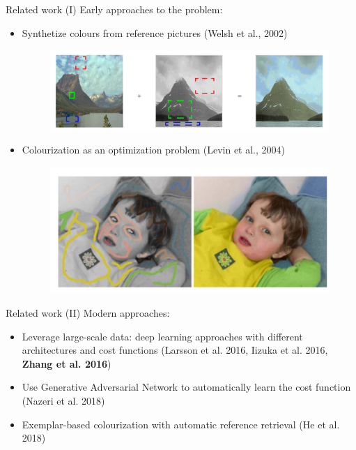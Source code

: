 \documentclass{beamer}
\begin{document}
\begin{frame}{Related work (I)}
  Early approaches to the problem:

    \medskip

    \begin{itemize}
      \item Synthetize colours from reference pictures (Welsh et al., 2002)

      \begin{figure}[!htb]
          \includegraphics[width=\linewidth]{resources/welsh.jpg}
        \endminipage
      \end{figure}

      \medskip

      \item Colourization as an optimization problem (Levin et al., 2004)

      \begin{figure}[!htb]
          \includegraphics[width=\linewidth]{resources/levin.jpg}
        \endminipage
      \end{figure}
    \end{itemize}
\end{frame}

\begin{frame}{Related work (II)}
  Modern approaches:
    \begin{itemize}
      \item Leverage large-scale data: deep learning approaches with different
            architectures and cost functions (Larsson et al. 2016,
            Iizuka et al. 2016, \textbf{Zhang et al. 2016})
      \item Use Generative Adversarial Network to automatically learn the cost
            function (Nazeri et al. 2018)
      \item Exemplar-based colourization with automatic reference retrieval
            (He et al. 2018)
    \end{itemize}
\end{frame}
\end{document}
